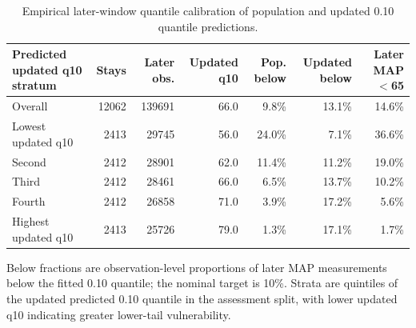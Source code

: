 \begin{table}[!htbp]
\caption{Empirical later-window quantile calibration of population and updated 0.10 quantile predictions.}
\label{tab:quantile_calibration}
\centering
\begin{tabular}{lrrrrrr}
\hline
Predicted updated q10 stratum & Stays & Later obs. & Updated q10 & Pop. below & Updated below & Later MAP $<$65\\
\hline
Overall & 12062 & 139691 & 66.0 & 9.8\% & 13.1\% & 14.6\%\\
Lowest updated q10 & 2413 & 29745 & 56.0 & 24.0\% & 7.1\% & 36.6\%\\
Second & 2412 & 28901 & 62.0 & 11.4\% & 11.2\% & 19.0\%\\
Third & 2412 & 28461 & 66.0 & 6.5\% & 13.7\% & 10.2\%\\
Fourth & 2412 & 26858 & 71.0 & 3.9\% & 17.2\% & 5.6\%\\
Highest updated q10 & 2413 & 25726 & 79.0 & 1.3\% & 17.1\% & 1.7\%\\
\hline
\end{tabular}
\par\smallskip
\footnotesize{Below fractions are observation-level proportions of later MAP measurements below the fitted 0.10 quantile; the nominal target is 10\%. Strata are quintiles of the updated predicted 0.10 quantile in the assessment split, with lower updated q10 indicating greater lower-tail vulnerability.}
\end{table}
